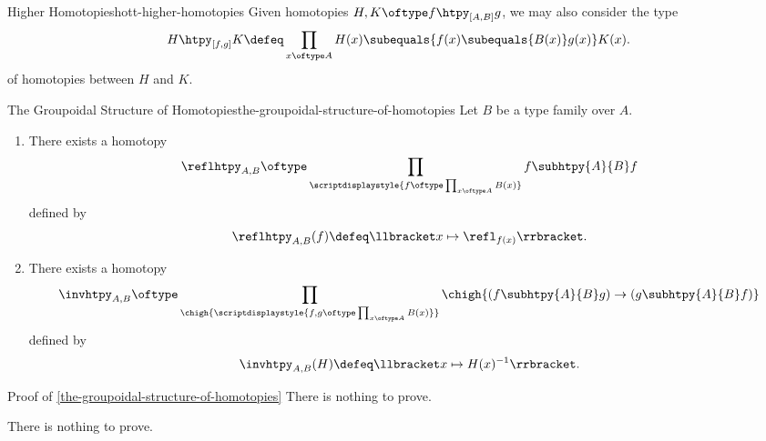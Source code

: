 \begin{remark}{Higher Homotopies}{hott-higher-homotopies}%
    Given homotopies $H,K\oftype f\htpy_{[A,B]}g$, we may also consider the type
    \[
        H\htpy_{[f,g]}K%
        \defeq%
        \prod_{x\oftype A}H(x)\subequals{f(x)\subequals{B(x)}g(x)}K(x).%
    \]%
    of homotopies between $H$ and $K$.
\end{remark}
\begin{proposition}{The Groupoidal Structure of Homotopies}{the-groupoidal-structure-of-homotopies}%
    Let $B$ be a type family over $A$.
    \begin{enumerate}
        \item\label{the-groupoidal-structure-of-homotopies-reflexivity}There exists a homotopy
            \[
                \reflhtpy_{A,B}%
                \oftype%
                \prod_{\scriptdisplaystyle{f\oftype\prod_{x\oftype A}B(x)}}f\subhtpy{A}{B}f%
            \]%
            defined by
            \[
                \reflhtpy_{A,B}(f)%
                \defeq%
                \llbracket x\mapsto\refl_{f(x)}\rrbracket.%
            \]%
        \item\label{the-groupoidal-structure-of-homotopies-inversion}There exists a homotopy
            \[
                \invhtpy_{A,B}%
                \oftype%
                \prod_{\chigh{\scriptdisplaystyle{f,g\oftype\prod_{x\oftype A}B(x)}}}\chigh{(f\subhtpy{A}{B}g)\to(g\subhtpy{A}{B}f)}%
            \]%
            defined by
            \[
                \invhtpy_{A,B}(H)%
                \defeq%
                \llbracket x\mapsto H(x)^{-1}\rrbracket.%
            \]%
    \end{enumerate}
\end{proposition}
\begin{Proof}{Proof of \cref{the-groupoidal-structure-of-homotopies}}%
    There is nothing to prove.

    There is nothing to prove.
\end{Proof}
\begin{appendices}

\end{appendices}

